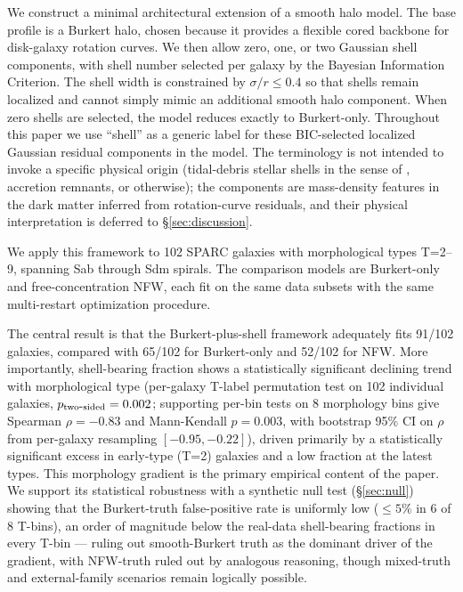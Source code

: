 We construct a minimal architectural extension of a smooth halo model. The base profile is a Burkert halo, chosen because it provides a flexible cored backbone for disk-galaxy rotation curves. We then allow zero, one, or two Gaussian shell components, with shell number selected per galaxy by the Bayesian Information Criterion. The shell width is constrained by $\sigma/r \leq 0.4$ so that shells remain localized and cannot simply mimic an additional smooth halo component. When zero shells are selected, the model reduces exactly to Burkert-only. Throughout this paper we use ``shell'' as a generic label for these BIC-selected localized Gaussian residual components in the model. The terminology is not intended to invoke a specific physical origin (tidal-debris stellar shells in the sense of \citealt{HelmiWhite1999}, accretion remnants, or otherwise); the components are mass-density features in the dark matter inferred from rotation-curve residuals, and their physical interpretation is deferred to \S\ref{sec:discussion}.

We apply this framework to 102 SPARC \citep{Lelli2016} galaxies with morphological types T=2--9, spanning Sab through Sdm spirals. The comparison models are Burkert-only and free-concentration NFW, each fit on the same data subsets with the same multi-restart optimization procedure.

The central result is that the Burkert-plus-shell framework adequately fits 91/102 galaxies, compared with 65/102 for Burkert-only and 52/102 for NFW. More importantly, shell-bearing fraction shows a statistically significant declining trend with morphological type (per-galaxy T-label permutation test on 102 individual galaxies, $p_{\rm two\mbox{-}sided} = 0.002$; supporting per-bin tests on 8 morphology bins give Spearman $\rho = -0.83$ and Mann-Kendall $p = 0.003$, with bootstrap 95\% CI on $\rho$ from per-galaxy resampling $[-0.95, -0.22]$), driven primarily by a statistically significant excess in early-type (T=2) galaxies and a low fraction at the latest types. This morphology gradient is the primary empirical content of the paper. We support its statistical robustness with a synthetic null test (\S\ref{sec:null}) showing that the Burkert-truth false-positive rate is uniformly low ($\leq 5\%$ in 6 of 8 T-bins), an order of magnitude below the real-data shell-bearing fractions in every T-bin --- ruling out smooth-Burkert truth as the dominant driver of the gradient, with NFW-truth ruled out by analogous reasoning, though mixed-truth and external-family scenarios remain logically possible.

